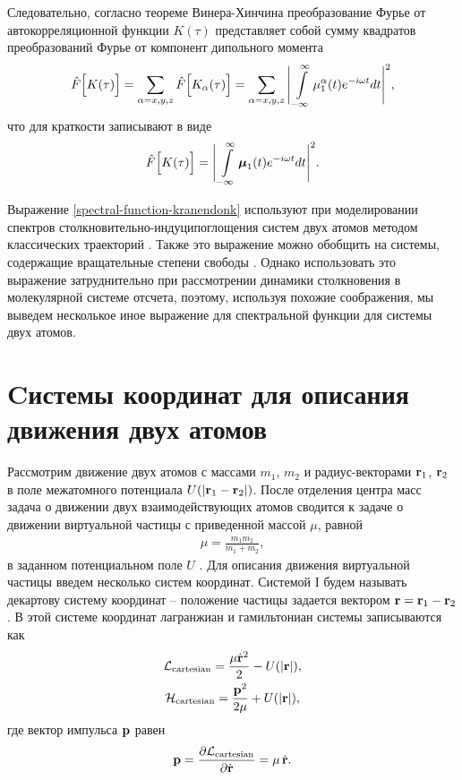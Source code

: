 Следовательно, согласно теореме Винера-Хинчина преобразование Фурье от автокорреляционной функции $K(\tau)$ представляет собой сумму квадратов преобразований Фурье от компонент дипольного момента 
\begin{gather}
    \hat{F}\Big[ K(\tau) \Big] = \sum_{\alpha = x,y,z} \hat{F} \Big[ K_\alpha(\tau) \Big] = \sum_{\alpha=x,y,z} \Bigg\vert \int\limits_{-\infty}^\infty \mu_1^\alpha(t) e^{-i\omega t} dt \Bigg\vert^2,
\end{gather}
% 
что для краткости записывают в виде 
\begin{gather}
    \hat{F} \Big[ K(\tau) \Big] = \Bigg\vert \int\limits_{-\infty}^\infty \boldsymbol{\mu}_1(t) e^{-i\omega t} dt \Bigg\vert^2. \label{correlation-theorem}
\end{gather}

Выражение \eqref{spectral-function-kranendonk} используют при моделировании спектров столкновительно-индуци поглощения систем двух атомов методом классических траекторий \cite{levine1967, mcquarrie1968, buryak2014}. Также это выражение можно обобщить на системы, содержащие вращательные степени свободы \cite{oparin2017}. Однако использовать это выражение затруднительно при рассмотрении динамики столкновения в молекулярной системе отсчета, поэтому, используя похожие соображения, мы выведем несколькое иное выражение для спектральной функции для системы двух атомов.

\section{Cистемы координат для описания движения двух атомов} \label{section:two-atom-coordinate-systems}

Рассмотрим движение двух атомов с массами $m_1$, $m_2$ и радиус-векторами $\mathbf{r}_1$, $\mathbf{r}_2$ в поле межатомного потенциала $U(\vert \mathbf{r}_1 - \mathbf{r}_2 \vert)$. После отделения центра масс задача о движении двух взаимодействующих атомов сводится к задаче о движении виртуальной частицы с приведенной массой $\mu$,  равной 
\begin{gather}
    \mu = \frac{m_1 m_2}{m_1 + m_2}, 
\end{gather}
%
в заданном потенциальном поле $U$ \cite{landau-volume1}. Для описания движения виртуальной частицы введем несколько систем координат. Системой I будем называть декартову систему координат -- положение частицы задается вектором $\mathbf{r} = \mathbf{r}_1 - \mathbf{r}_2$. В этой системе координат лагранжиан и гамильтониан системы записываются как 
\begin{gather}
    \mathcal{L}_\text{cartesian} = \frac{\mu \dot{\mathbf{r}}^2}{2} - U( \vert \mathbf{r} \vert ), \label{two-atom-cartesian-lagrangian} \\
    \mathcal{H}_\text{cartesian} = \frac{\mathbf{p}^2}{2\mu} + U( \vert \mathbf{r} \vert ), \label{two-atom-cartesian-hamiltonian}
\end{gather}
%
где вектор импульса $\mathbf{p}$ равен
\begin{gather}
    \mathbf{p} = \frac{\partial \mathcal{L}_\text{cartesian}}{\partial \dot{\mathbf{r}}} = \mu \, \dot{\mathbf{r}}. \label{two-atom-cartesian-momenta}
\end{gather}

